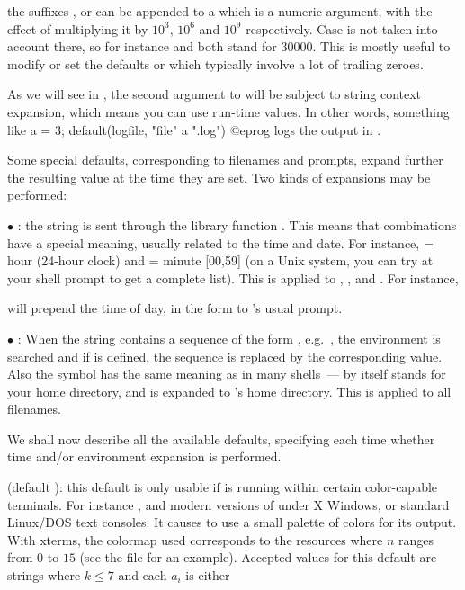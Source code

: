  the suffixes ,  or  can be appended to
a  which is a numeric argument, with the effect of multiplying it
by $10^3$, $10^6$ and $10^9$ respectively. Case is not taken into account
there, so for instance  and  both stand for $30000$. This
is mostly useful to modify or set the defaults  or
 which typically involve a lot of trailing zeroes.

 As we will see in ,
the second argument to  will be subject to string context
expansion, which means you can use run-time values. In other words, something
like
\bprog
  a = 3;
  default(logfile, "file" a ".log")
@eprog
logs the output in .

Some special defaults, corresponding to filenames and prompts, expand further
the resulting value at the time they are set. Two kinds of expansions may be
performed:

$\bullet$ : the string is sent through the library
function . This means that \kbd{\%} combinations have
a special meaning, usually related to the time and date. For instance,
 = hour (24-hour clock) and  = minute [00,59] (on a Unix
system, you can try  at your shell prompt to get a complete
list). This is applied to , , and . For
instance,


\noindent
will prepend the time of day, in the form 
to 's usual prompt.

$\bullet$ : When the string contains a sequence of
the form , e.g.~, the environment is
searched and if  is defined, the sequence is replaced by the
corresponding value. Also the \kbd{\til} symbol has the same meaning as in
many shells~--- \kbd{\til} by itself stands for your home directory, and
 is expanded to 's home directory. This is applied
to all filenames. \label{se:envir}

We shall now describe all the available defaults, specifying each time
whether time and/or environment expansion is performed.

 (default ): this default is only usable if
\label{se:colors}
is running within certain color-capable terminals. For instance ,
 and modern versions of  under X Windows, or
standard Linux/DOS text consoles. It causes  to use a small palette of
colors for its output. With xterms, the colormap used corresponds to the
resources  where $n$ ranges from $0$ to $15$ (see the
file  for an example). Accepted values for this
default are strings  where $k\le7$ and each
$a_i$ is either

